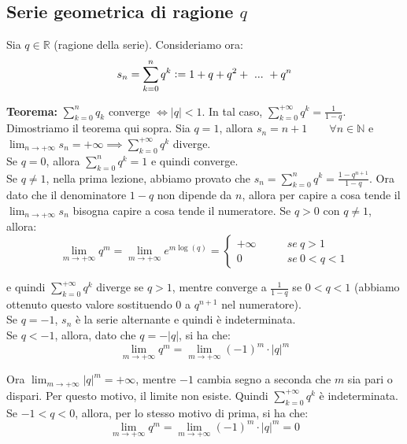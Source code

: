 \documentclass{article}
\begin{document}
\subsection{Serie geometrica di ragione $q$}
Sia $q \in \mathbb{R}$ (ragione della serie). Consideriamo ora:
\begin{equation*}
    s_n = \sum_{k = 0}^n q^k \vcentcolon = 1 + q + q^2 + \ ... \ + q^n
\end{equation*}

\noindent\textbf{Teorema:} $\sum_{k = 0}^{n} q_k$ converge $\iff |q| < 1$. In tal caso, $\sum_{k = 0}^{+\infty} q^k = \frac{1}{1 - q}$.\\

\noindent Dimostriamo il teorema qui sopra. Sia $q = 1$, allora $s_n = n + 1 \qquad \forall n \in \mathbb{N}$ e $\lim_{n \to +\infty} s_n = +\infty \implies \sum_{k = 0}^{+\infty} q^k$ diverge. \\
Se $q = 0$, allora $\sum_{k = 0}^n q^k = 1$ e quindi converge. \\
Se $q \neq 1$, nella prima lezione, abbiamo provato che $s_n = \sum_{k = 0}^n q^k = \frac{1 - q^{n + 1}}{1 - q}$. Ora dato che il denominatore $1 - q$ non dipende da $n$, allora per capire a cosa tende il $\lim_{n \to +\infty} s_n$ bisogna capire a cosa tende il numeratore. Se $q > 0$ con $q \neq 1$, allora:
\begin{equation*}
    \lim_{m \to +\infty} q^m = \lim_{m \to +\infty} e^{m\log(q)} = \begin{cases}
        +\infty \qquad & se \ q > 1 \\
        0 \qquad & se \ 0 < q < 1
    \end{cases}
\end{equation*}

\noindent e quindi $\sum_{k = 0}^{+\infty} q^k$ diverge se $q > 1$, mentre converge a $\frac{1}{1 - q}$ se $0 < q < 1$ (abbiamo ottenuto questo valore sostituendo $0$ a $q^{n + 1}$ nel numeratore).\\
Se $q = -1$, $s_n$ è la serie alternante e quindi è indeterminata.\\
Se $q < -1$, allora, dato che $q = -|q|$, si ha che:
\begin{equation*}
    \lim_{m \to +\infty} q^m = \lim_{m \to +\infty} (-1)^m \cdot |q|^m
\end{equation*}

\noindent Ora $\lim_{m \to +\infty} |q|^m = +\infty$, mentre $-1$ cambia segno a seconda che $m$ sia pari o dispari. Per questo motivo, il limite non esiste. Quindi $\sum_{k = 0}^{+\infty} q^k$ è indeterminata.\\
Se $-1 < q < 0$, allora, per lo stesso motivo di prima, si ha che:
\begin{equation*}
    \lim_{m \to +\infty} q^m = \lim_{m \to +\infty} (-1)^m \cdot |q|^m = 0
\end{equation*}
\end{document}
